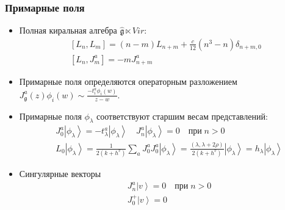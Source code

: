 \documentclass[pdftex]{beamer}
\newcommand{\gf}{\mathfrak{g}}
\newcommand{\gfh}{\hat{\mathfrak{g}}}
\theoremstyle{definition} \newtheorem{Def}{Определение}
\begin{document}
\begin{frame}
  \frametitle{Примарные поля}
  \begin{itemize}
  \item Полная киральная алгебра $\gfh \ltimes Vir$:
    \begin{equation}
      \label{eq:92}
      \begin{aligned}
        \left[L_n,L_m\right]=(n-m)L_{n+m}+\frac{c}{12}(n^3-n)\delta_{n+m,0}\\
        \left[L_n,J^a_m\right]=-mJ^a_{n+m}
      \end{aligned}
    \end{equation}
  \item Примарные поля определяются операторным разложением $J_{\gf}^{a}(z)\phi_{i}(w)\sim \frac{-t^{a}_{i}\phi_{i}(w)}{z-w}$.
  \item Примарные поля $\phi_{\lambda}$ соответствуют старшим весам представлений:
    \begin{equation*}
      \begin{aligned}
        & J_0^a\left|\phi_{\lambda}\right>=-t^a_{\lambda}\left|\phi_{\lambda}\right>  \quad    J^a_n\left|\phi_{\lambda}\right>=0 \quad \mbox{при}\; n>0 \\
        & L_0\left|\phi_{\lambda}\right>=\frac{1}{2(k+h^v)}\sum_aJ^a_0J^a_0\left|\phi_{\lambda}\right>=\frac{(\lambda,\lambda+2\rho)}{2(k+h^v)}\left|\phi_{\lambda}\right>=h_{\lambda} \left|\phi_{\lambda}\right>
      \end{aligned}
    \end{equation*}
  \item Сингулярные векторы 
    \begin{equation*}
    \begin{aligned}
      &J^a_n\left|v \right>=0 \quad \mbox{при}\; n>0 \\
      & J^{+}_{0} \left|v \right>=0
    \end{aligned}
    \end{equation*}
  \end{itemize}
\end{frame}
\end{document}

